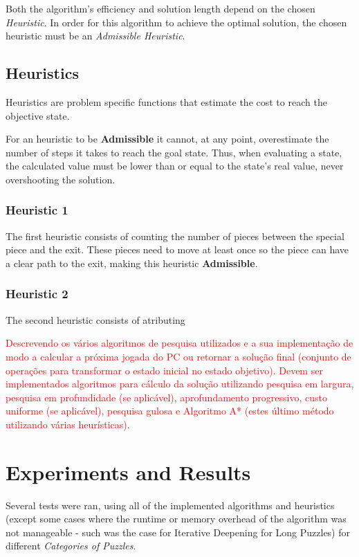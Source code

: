 \documentclass[conference]{IEEEtran}
\begin{document}
Both the algorithm's efficiency and solution length depend on the chosen \textit{Heuristic}. In order for this algorithm to achieve the optimal solution, the chosen heuristic must be an \textit{Admissible Heuristic}.


\subsection{Heuristics}

Heuristics are problem specific functions that estimate the cost to reach the objective state.

For an heuristic to be \textbf{Admissible} it cannot, at any point, overestimate the number of steps it takes to reach the goal state. Thus, when evaluating a state, the calculated value must be lower than or equal to the state's real value, never overshooting the solution.

\subsubsection{Heuristic 1}

The first heuristic consists of counting the number of pieces between the special piece and the exit. These pieces need to move at least once so the piece can have a clear path to the exit, making this heuristic \textbf{Admissible}.

\subsubsection{Heuristic 2}

The second heuristic consists of atributing 

\textcolor{red}{Descrevendo os vários algoritmos de pesquisa utilizados e a sua implementação de modo a calcular a próxima jogada do PC ou retornar a solução final (conjunto de operações para transformar o estado inicial no estado objetivo). Devem ser implementados algoritmos para cálculo da solução utilizando pesquisa em largura, pesquisa em profundidade (se aplicável), aprofundamento progressivo, custo uniforme (se aplicável), pesquisa gulosa e Algoritmo A* (estes último método utilizando várias heurísticas).}

\section{Experiments and Results}
Several tests were ran, using all of the implemented algorithms and heuristics (except some cases where the runtime or memory overhead of the algorithm was not manageable - such was the case for Iterative Deepening for Long Puzzles) for different \textit{Categories of Puzzles}.
\end{document}
